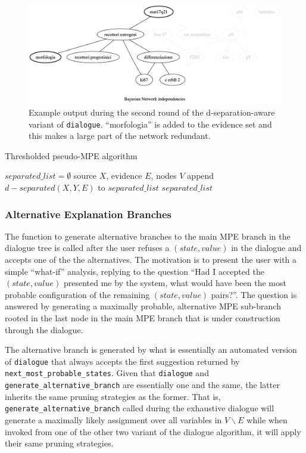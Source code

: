 \begin{figure}[htbp]
\centerline{\includegraphics[width=\columnwidth]{methodology/images/example-d-separation-mpe_2}}
\caption{Example output during the second round of the d-separation-aware variant of \texttt{dialogue}.
	\enquote{morfologia} is added to the evidence set and this makes a large part of the network redundant.}
\label{fig:pseudo-mpe-independencies_2}
\end{figure}

\begin{algorithm}[htp!]
	\caption{Thresholded pseudo-MPE algorithm}
	\label{alg:pseudo-mpe-thresholded}
	\begin{algorithmic}
		\STATE $separated\_list = \emptyset$
		 source $X$, evidence $E$, nodes $V$
		\STATE append $d-separated(X, Y, E)$ to $separated\_list$ 
		\ENDFOR
		 $separated\_list$
	\end{algorithmic}
\end{algorithm} 

\subsubsection{Alternative Explanation Branches}
The function to generate alternative branches to the main MPE branch in the dialogue tree is called after the user refuses a $(state,value)$ in the dialogue and accepts one of the the alternatives.
The motivation is to present the user with a simple \enquote{what-if} analysis, replying to the question \enquote{Had I accepted the $(state,value)$ presented me by the system, what would have been the most probable configuration of the remaining $(state,value)$ pairs?}.
The question is answered by generating a maximally probable, alternative MPE sub-branch rooted in the last node in the main MPE branch that is under construction through the dialogue.

The alternative branch is generated by what is essentially an automated version of \texttt{dialogue} that always accepts the first suggestion returned by \texttt{next\_most\_probable\_states}.
Given that \texttt{dialogue} and \texttt{generate\_alternative\_branch} are essentially one and the same, the latter inherits the same pruning strategies as the former.
That is, \texttt{generate\_alternative\_branch} called during the exhaustive dialogue will generate a maximally likely assignment over all variables in $V \smallsetminus E$ while when invoked from one of the other two variant of the dialogue algorithm, it will apply their same pruning strategies.

